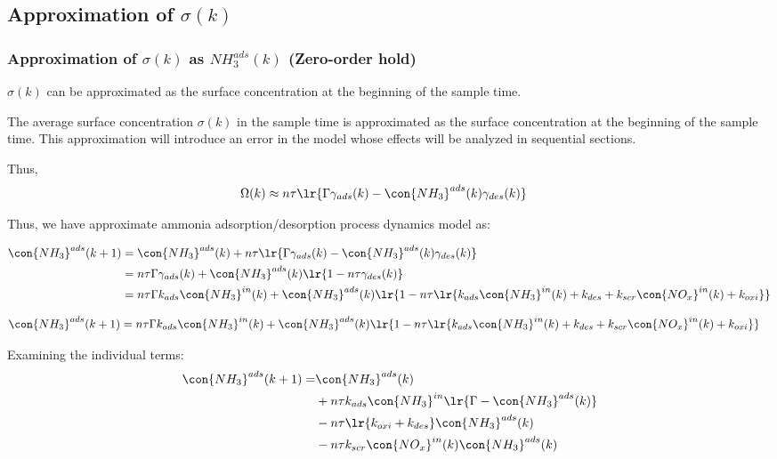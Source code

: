 \subsection{Approximation of $\sigma(k)$}
\subsubsection{Approximation of $\sigma(k)$ as $NH_3^{ads}(k)$ (Zero-order hold)}
 $\sigma(k)$ can be approximated as the surface concentration at the beginning of the sample time.

The average surface concentration $\sigma(k)$ in the sample time is approximated
as the surface concentration at the beginning of the sample time. This
approximation will introduce an error in the model whose effects will be
analyzed in sequential sections.

Thus,
\begin{align}
    \Omega(k) &\approx n \tau \lr{\Gamma \gamma_{ads} (k) - \con{NH_3}^{ads}(k) \gamma_{des} (k)}
\end{align}

Thus, we have approximate ammonia adsorption/desorption process dynamics model as:

\begin{align*}
    \con{NH_3}^{ads}(k + 1) &= \con{NH_3}^{ads} (k) + n \tau \lr{\Gamma \gamma_{ads} (k) - \con{NH_3}^{ads}(k) \gamma_{des} (k)}\\
    &= n \tau \Gamma \gamma_{ads} (k) + \con{NH_3}^{ads} (k) \lr{1 - n \tau \gamma_{des} (k)}\\
    &= n \tau \Gamma k_{ads} \con{NH_3}^{in}(k)  + \con{NH_3}^{ads} (k) \lr{1 - n \tau \lr{k_{ads} \con{NH_3}^{in}(k) + k_{des} + k_{scr} \con{NO_x}^{in}(k) + k_{oxi}}}
\end{align*}


\begin{align}
    \con{NH_3}^{ads}(k + 1) &= n \tau \Gamma k_{ads} \con{NH_3}^{in}(k)  + \con{NH_3}^{ads} (k) \lr{1 - n \tau \lr{k_{ads} \con{NH_3}^{in}(k) + k_{des} + k_{scr} \con{NO_x}^{in}(k) + k_{oxi}}}
\end{align}

Examining the individual terms:
\begin{align*}
    \con{NH_3}^{ads}(k + 1) =& \con{NH_3}^{ads}(k)\\
        &+ n\tau k_{ads} \con{NH_3}^{in} \lr{\Gamma - \con{NH_3}^{ads}(k)} \\
        &- n \tau \lr{k_{oxi} + k_{des}} \con{NH_3}^{ads} (k)\\
        &- n \tau k_{scr} \con{NO_x}^{in}(k) \con{NH_3}^{ads}(k)
\end{align*}

